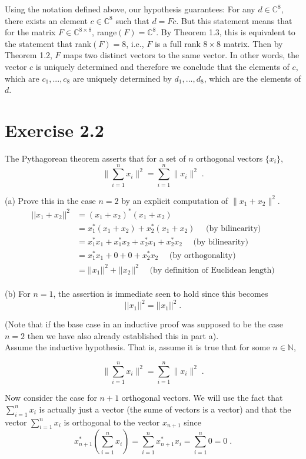 \documentclass[11pt]{article}
\begin{document}
Using the notation defined above, our hypothesis guarantees:
For any $d \in \mathbb{C}^8$, there exists an element $c \in \mathbb{C}^8$ such that $d = Fc$. But this statement means that for the matrix $F \in \mathbb{C}^{8 \times 8}$, range$(F) = \mathbb{C}^8$. By Theorem 1.3, this is equivalent to the statement that rank$(F) = 8$, i.e., $F$ is a full rank $8 \times 8$ matrix. Then by Theorem 1.2, $F$ maps two distinct vectors to the same vector. In other words, the vector $c$ is uniquely determined and therefore we conclude that the elements of $c$, which are $c_1,...,c_8$ are uniquely determined by $d_1,...,d_8$, which are the elements of $d$.

\section*{Exercise 2.2}

The Pythagorean theorem asserts that for a set of $n$ orthogonal vectors $\{x_i\}$,
$$\lVert\sum_{i=1}^n x_i \rVert ^2 = \sum_{i=1}^n \lVert x_i \rVert ^2 \;.$$

(a) Prove this in the case $n=2$ by an explicit computation of $\lVert x_1 + x_2 \rVert ^2$. \\

\begin{align*}
||x_1+x_2||^2 &= (x_1+x_2)^*(x_1+x_2) \\
&=x_1^*(x_1+x_2) + x_2^*(x_1+x_2) \quad \text{ (by bilinearity)}\\
&= x_1^*x_1 + x_1^*x_2 + x_2^*x_1 + x_2^*x_2 \quad \text{ (by bilinearity)}\\
&=x_1^*x_1 + 0 + 0 + x_2^*x_2 \quad \text{ (by orthogonality)}\\
&=||x_1||^2 + ||x_2||^2 \quad \text{ (by definition of Euclidean length)}
\end{align*}\\

(b) For $n=1$, the assertion is immediate seen to hold since this becomes
$$||x_1||^2 = ||x_1||^2\;.$$

(Note that if the base case in an inductive proof was supposed to be the case $n=2$ then we have also already established this in part a). \\

Assume the inductive hypothesis. That is, assume it is true that for some $n \in \mathbb{N}$,

$$\lVert\sum_{i=1}^n x_i \rVert ^2 = \sum_{i=1}^n \lVert x_i \rVert ^2 \;.$$

Now consider the case for $n+1$ orthogonal vectors. We will use the fact that $\sum_{i=1}^n x_i$ is actually just a vector (the sume of vectors is a vector) and that the vector $\sum_{i=1}^n x_i$ is orthogonal to the vector $x_{n+1}$ since $$x_{n+1}^*\left(\sum_{i=1}^n x_i\right) = \sum_{i=1}^n x_{n+1}^*x_i = \sum_{i=1}^n 0 = 0\;.$$
\end{document}
